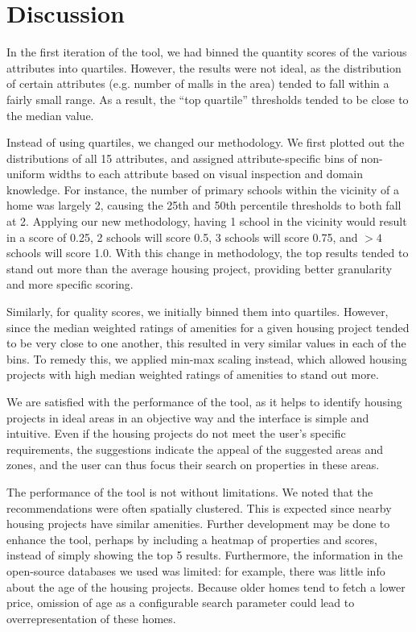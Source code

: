 \documentclass[a4paper, 11pt]{article}
\begin{document}
\section{Discussion}

In the first iteration of the tool, we had binned the quantity scores of the various attributes into quartiles. However, the results were not ideal, as the distribution of certain attributes (e.g. number of malls in the area) tended to fall within a fairly small range. As a result, the “top quartile” thresholds tended to be close to the median value. 

Instead of using quartiles, we changed our methodology. We first plotted out the distributions of all 15 attributes, and assigned attribute-specific bins of non-uniform widths to each attribute based on visual inspection and domain knowledge. For instance, the number of primary schools within the vicinity of a home was largely 2, causing the 25th and 50th percentile thresholds to both fall at 2. Applying our new methodology, having 1 school in the vicinity would result in a score of 0.25, 2 schools will score 0.5, 3 schools will score 0.75, and $>4$ schools will score 1.0. With this change in methodology, the top results tended to stand out more than the average housing project, providing better granularity and more specific scoring.

Similarly, for quality scores, we initially binned them into quartiles. However, since the median weighted ratings of amenities for a given housing project tended to be very close to one another, this resulted in very similar values in each of the bins. To remedy this, we applied min-max scaling instead, which allowed housing projects with high median weighted ratings of amenities to stand out more.

We are satisfied with the performance of the tool, as it helps to identify housing projects in ideal areas in an objective way and the interface is simple and intuitive. Even if the housing projects do not meet the user’s specific requirements, the suggestions indicate the appeal of the suggested areas and zones, and the user can thus focus their search on properties in these areas.

The performance of the tool is not without limitations. We noted that the recommendations were often spatially clustered. This is expected since nearby housing projects have similar amenities. Further development may be done to enhance the tool, perhaps by including a heatmap of properties and scores, instead of simply showing the top 5 results. Furthermore, the information in the open-source databases we used was limited: for example, there was little info about the age of the housing projects. Because older homes tend to fetch a lower price, omission of age as a configurable search parameter could lead to overrepresentation of these homes.
\end{document}
